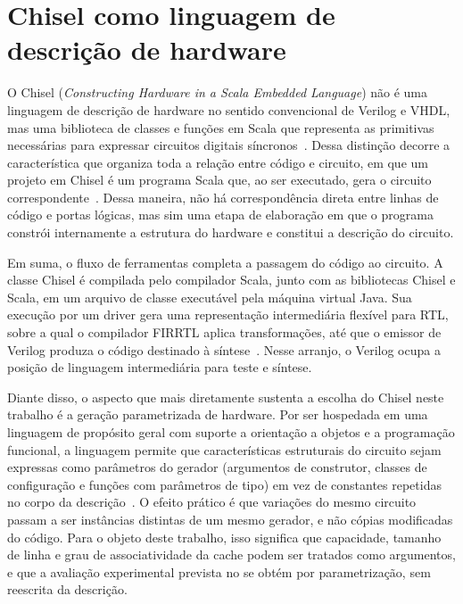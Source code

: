 \section{Chisel como linguagem de descrição de hardware}\label{sec:2.2}

O Chisel (\emph{Constructing Hardware in a Scala Embedded Language}) não é uma linguagem de descrição de hardware no sentido convencional de Verilog e VHDL, mas uma biblioteca de classes e funções em Scala que representa as primitivas necessárias para expressar circuitos digitais síncronos~\cite{schoeberl2025chisel}. Dessa distinção decorre a característica que organiza toda a relação entre código e circuito, em que um projeto em Chisel é um programa Scala que, ao ser executado, gera o circuito correspondente~\cite{schoeberl2025chisel}. Dessa maneira, não há correspondência direta entre linhas de código e portas lógicas, mas sim uma etapa de elaboração em que o programa constrói internamente a estrutura do hardware e constitui a descrição do circuito.

Em suma, o fluxo de ferramentas completa a passagem do código ao circuito. A classe Chisel é compilada pelo compilador Scala, junto com as bibliotecas Chisel e Scala, em um arquivo de classe executável pela máquina virtual Java. Sua execução por um driver gera uma representação intermediária flexível para RTL, sobre a qual o compilador FIRRTL aplica transformações, até que o emissor de Verilog produza o código destinado à síntese~\cite{schoeberl2025chisel}. Nesse arranjo, o Verilog ocupa a posição de linguagem intermediária para teste e síntese.

Diante disso, o aspecto que mais diretamente sustenta a escolha do Chisel neste trabalho é a geração parametrizada de hardware. Por ser hospedada em uma linguagem de propósito geral com suporte a orientação a objetos e a programação funcional, a linguagem permite que características estruturais do circuito sejam expressas como parâmetros do gerador (argumentos de construtor, classes de configuração e funções com parâmetros de tipo) em vez de constantes repetidas no corpo da descrição~\cite{schoeberl2025chisel}. O efeito prático é que variações do mesmo circuito passam a ser instâncias distintas de um mesmo gerador, e não cópias modificadas do código. Para o objeto deste trabalho, isso significa que capacidade, tamanho de linha e grau de associatividade da cache podem ser tratados como argumentos, e que a avaliação experimental prevista no  se obtém por parametrização, sem reescrita da descrição.

